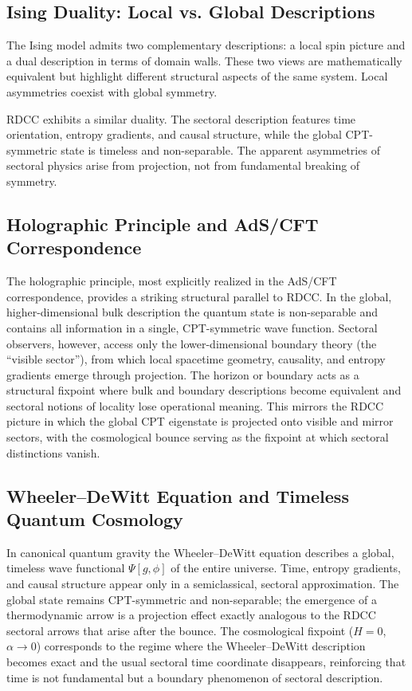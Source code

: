 \documentclass[11pt,a4paper]{article}
\begin{document}
\subsection{Ising Duality: Local vs. Global Descriptions}

The Ising model admits two complementary descriptions: a local spin picture and a dual description in terms of domain walls. These two views are mathematically equivalent but highlight different structural aspects of the same system. Local asymmetries coexist with global symmetry.

RDCC exhibits a similar duality. The sectoral description features time orientation, entropy gradients, and causal structure, while the global CPT-symmetric state is timeless and non-separable. The apparent asymmetries of sectoral physics arise from projection, not from fundamental breaking of symmetry.

\subsection{Holographic Principle and AdS/CFT Correspondence}

The holographic principle, most explicitly realized in the AdS/CFT correspondence, provides a striking structural parallel to RDCC. In the global, higher-dimensional bulk description the quantum state is non-separable and contains all information in a single, CPT-symmetric wave function. Sectoral observers, however, access only the lower-dimensional boundary theory (the “visible sector”), from which local spacetime geometry, causality, and entropy gradients emerge through projection. The horizon or boundary acts as a structural fixpoint where bulk and boundary descriptions become equivalent and sectoral notions of locality lose operational meaning. This mirrors the RDCC picture in which the global CPT eigenstate is projected onto visible and mirror sectors, with the cosmological bounce serving as the fixpoint at which sectoral distinctions vanish.

\subsection{Wheeler--DeWitt Equation and Timeless Quantum Cosmology}

In canonical quantum gravity the Wheeler--DeWitt equation describes a global, timeless wave functional $\Psi[g, \phi]$ of the entire universe. Time, entropy gradients, and causal structure appear only in a semiclassical, sectoral approximation. The global state remains CPT-symmetric and non-separable; the emergence of a thermodynamic arrow is a projection effect exactly analogous to the RDCC sectoral arrows that arise after the bounce. The cosmological fixpoint ($H = 0$, $\alpha \to 0$) corresponds to the regime where the Wheeler--DeWitt description becomes exact and the usual sectoral time coordinate disappears, reinforcing that time is not fundamental but a boundary phenomenon of sectoral description.
\end{document}
